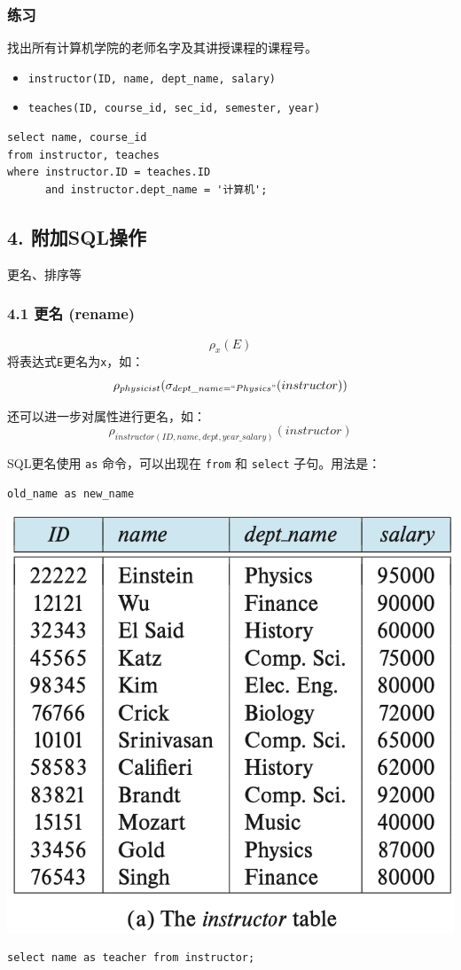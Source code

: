 \documentclass[aspectratio=169, 14pt]{beamer}
\begin{document}
\begin{frame}[fragile]
    \frametitle{练习}
    {\large {}} 找出所有计算机学院的老师名字及其讲授课程的课程号。

\begin{itemize}
    \item \texttt{instructor(ID, name, dept\_name, salary)}
    \item \texttt{teaches(ID, course\_id, sec\_id, semester, year)}
\end{itemize}
    \pause
    \begin{verbatim} 
select name, course_id
from instructor, teaches
where instructor.ID = teaches.ID 
      and instructor.dept_name = '计算机';
    \end{verbatim}    
\end{frame}
\begin{frame}
    \section{\textcolor{darkmidnightblue}{4. 附加SQL操作}} 
更名、排序等
\end{frame}
\begin{frame}
    \frametitle{4.1 更名 (rename)}
{\large \[\rho_x(E)\]}
将表达式\texttt{E}更名为\texttt{x}，如：\[\rho_{physicist}(\sigma_{dept\_name=``Physics"}(instructor))\]

还可以进一步对属性进行更名，如：\[\rho_{instructor(ID, name, dept, year\_salary)}(instructor)\]

\end{frame}

\begin{frame}[fragile]
    SQL更名使用 \texttt{as} 命令，可以出现在 \texttt{from} 和 \texttt{select} 子句。用法是：
\begin{verbatim}
old_name as new_name    
\end{verbatim}

\includegraphics[width=.6\textwidth,trim={0cm 8.5cm 0cm 0cm},clip]{table/instructor}

\begin{verbatim} 
select name as teacher from instructor;
\end{verbatim} 

\end{frame}
\end{document}
